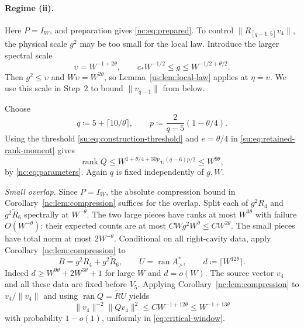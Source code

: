 \documentclass[11pt]{article}
\numberwithin{equation}{section}
\theoremstyle{remark}
\newcommand{\rank}{\operatorname{rank}}
\newcommand{\ran}{\operatorname{ran}}
\begin{document}
\paragraph{Regime (ii).}
Here $P=I_W$, and preparation gives \eqref{nc:eq:prepared}.
To control $\|R_{[q-1,5]}v_4\|$, the physical scale $g^2$ may be too small for
the local law. Introduce the larger spectral scale
\begin{equation}\label{nc:eq:buffer-scale}
 \upsilon=W^{-1+2\theta},\qquad
 c_*W^{-1/2}\le g\le W^{-1/2+\theta/2}.
\end{equation}
Then $g^2\le\upsilon$ and $W\upsilon=W^{2\theta}$, so
Lemma~\ref{us:lem:local-law} applies at $\eta=\upsilon$.
We use this scale in Step~2 to bound $\|v_{q-1}\|$ from below.

Choose
\begin{equation}\label{nc:eq:parameters}
 q\coloneqq5+\lceil10/\theta\rceil,\qquad
 p\coloneqq\frac2{q-5}(1-\theta/4).
\end{equation}
Using the threshold \eqref{su:eq:construction-threshold} and
$e=\theta/4$ in \eqref{su:eq:retained-rank-moment} gives
\begin{equation}\label{nc:eq:dimension}
 \rank Q\le W^{1+\theta/4+30p}\upsilon^{(q-6)p/2}\le W^{9\theta},
\end{equation}
by \eqref{nc:eq:parameters}. Again $q$ is fixed independently of $g,W$.

\smallskip\noindent
\emph{Small overlap.}
Since $P=I_W$, the absolute compression bound in
Corollary~\ref{nc:lem:compression} suffices for the overlap.
Split each of $g^2 R_4$ and $g^2 \overleftarrow R_6$ spectrally at $W^{-\theta}$.
The two large pieces have ranks at most $W^{3\theta}$ with failure
$O(W^{-\theta})$: their expected counts are at most
$CWg^2 W^\theta\le CW^{2\theta}$. The small pieces have total norm
at most $2W^{-\theta}$. Conditional on all right-cavity data, apply
Corollary~\ref{nc:lem:compression} to
\[
 B=g^2 R_4+g^2 \overleftarrow R_6,\qquad U=\ran A_>^*,\qquad
 d\coloneqq \lceil W^{12\theta}\rceil.
\]
Indeed $d\ge W^{9\theta}+2W^{3\theta}+1$ for large $W$ and $d=o(W)$.
The source vector $v_4$ and all these data are fixed before $V_5$.
Applying Corollary~\ref{nc:lem:compression} to $v_4/\|v_4\|$ and using
$\ran Q=\widetilde R U$ yields
\begin{equation}
 \|v_4\|^{-2} \|Qv_4\|^2\le CW^{-1+12\theta}
                 \le W^{-1+13\theta}
 \label{nc:eq:geometry}
\end{equation}
with probability $1-o(1)$, uniformly in \eqref{eq:critical-window}.
\end{document}
